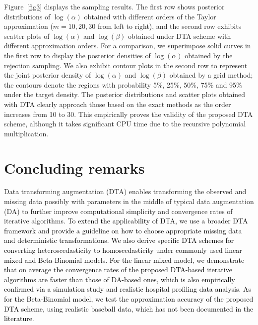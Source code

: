 \documentclass[12pt]{article}
\begin{document}
Figure~\ref{fig3} displays the sampling results. The first row shows  posterior distributions of $\log(\alpha)$ obtained with different orders of the Taylor approximation  ($m=10, 20, 30$ from left to right), and the second row exhibits  scatter plots of $\log(\alpha)$ and $\log(\beta)$ obtained under DTA  scheme with different approximation orders. For a comparison, we superimpose solid curves in the first row to display the posterior densities of $\log(\alpha)$ obtained by the rejection sampling. We also exhibit contour plots in the second row to represent the joint posterior density of $\log(\alpha)$ and $\log(\beta)$ obtained by a grid method; the contours denote the regions with probability 5\%, 25\%, 50\%, 75\% and 95\% under the target density. The posterior distributions and scatter plots obtained with DTA  clearly approach those based on the exact methods as the order increases from 10 to 30. This empirically proves the validity of the proposed DTA scheme, although it takes significant CPU time due to the recursive polynomial multiplication.




\section{Concluding remarks}\label{sec5}

Data transforming augmentation (DTA) enables transforming the observed and missing data possibly with parameters in the middle of typical  data augmentation (DA) to further improve computational simplicity and convergence rates of iterative algorithms. \textcolor{black}{To extend the applicability of DTA, we use a broader DTA framework and provide a  guideline on how to choose appropriate missing data and deterministic transformations. We also derive specific DTA schemes for converting heteroscedasticity to homoscedasticity under commonly used linear mixed and Beta-Binomial models. For the linear mixed model, we demonstrate that on average the convergence rates of the proposed DTA-based iterative algorithms are faster than those of DA-based ones, which is also empirically  confirmed  via a simulation study and realistic hospital profiling data analysis. As for the Beta-Binomial model, we test the approximation accuracy of the proposed DTA scheme, using realistic baseball data, which has not been documented in the literature.}
\end{document}
